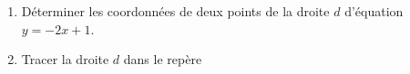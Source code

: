 
\begin{enumerate}
\item Déterminer les coordonnées de deux points de la droite $d$ d'équation $y=-2x+1$.
\item Tracer la droite $d$ dans le repère \Oij
\end{enumerate}
